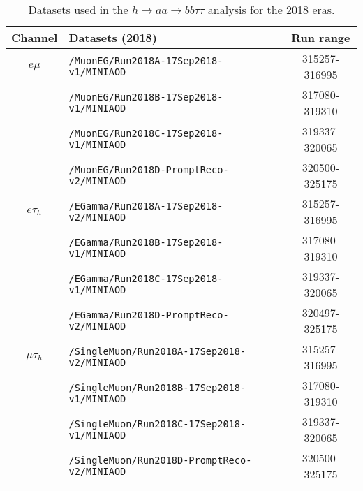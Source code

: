     \begin{table}[ht]
    \begin{center}
    {\scriptsize
    \begin{tabular}{|c|l|c|}
    \hline
    Channel & Datasets (2018) & Run range\\
    \hline
    $e\mu$ & \texttt{/MuonEG/Run2018A-17Sep2018-v1/MINIAOD} & 315257-316995\\
    & \texttt{/MuonEG/Run2018B-17Sep2018-v1/MINIAOD} & 317080-319310\\
    & \texttt{/MuonEG/Run2018C-17Sep2018-v1/MINIAOD} & 319337-320065\\
    & \texttt{/MuonEG/Run2018D-PromptReco-v2/MINIAOD} & 320500-325175\\
    \hline
    $e\tau_{h}$ & \texttt{/EGamma/Run2018A-17Sep2018-v2/MINIAOD} & 315257-316995\\
    & \texttt{/EGamma/Run2018B-17Sep2018-v1/MINIAOD} & 317080-319310\\
    & \texttt{/EGamma/Run2018C-17Sep2018-v1/MINIAOD} & 319337-320065\\
    & \texttt{/EGamma/Run2018D-PromptReco-v2/MINIAOD} & 320497-325175\\
    \hline
    $\mu\tau_{h}$ & \texttt{/SingleMuon/Run2018A-17Sep2018-v2/MINIAOD} & 315257-316995\\
    & \texttt{/SingleMuon/Run2018B-17Sep2018-v1/MINIAOD} & 317080-319310\\
    & \texttt{/SingleMuon/Run2018C-17Sep2018-v1/MINIAOD} & 319337-320065\\
    & \texttt{/SingleMuon/Run2018D-PromptReco-v2/MINIAOD} & 320500-325175\\
    \hline
    \end{tabular}
    }
    \end{center}
    \caption{Datasets used in the $h\rightarrow aa \rightarrow bb\tau\tau$ analysis for the 2018 eras.}
    \label{tab:2018datasets}
\end{table}
    
